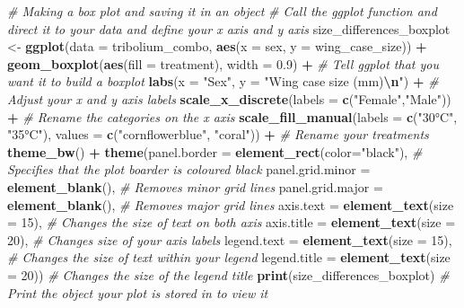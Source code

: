 \documentclass[
]{book}
\newenvironment{Shaded}{\begin{snugshade}}{\end{snugshade}}
\newcommand{\AttributeTok}[1]{\textcolor[rgb]{0.13,0.29,0.53}{#1}}
\newcommand{\CommentTok}[1]{\textcolor[rgb]{0.56,0.35,0.01}{\textit{#1}}}
\newcommand{\DecValTok}[1]{\textcolor[rgb]{0.00,0.00,0.81}{#1}}
\newcommand{\FloatTok}[1]{\textcolor[rgb]{0.00,0.00,0.81}{#1}}
\newcommand{\FunctionTok}[1]{\textcolor[rgb]{0.13,0.29,0.53}{\textbf{#1}}}
\newcommand{\NormalTok}[1]{#1}
\newcommand{\OtherTok}[1]{\textcolor[rgb]{0.56,0.35,0.01}{#1}}
\newcommand{\SpecialCharTok}[1]{\textcolor[rgb]{0.81,0.36,0.00}{\textbf{#1}}}
\newcommand{\StringTok}[1]{\textcolor[rgb]{0.31,0.60,0.02}{#1}}
\begin{document}
\begin{Shaded}
\begin{Highlighting}[]
\CommentTok{\# Making a box plot and saving it in an object}
\CommentTok{\# Call the ggplot function and direct it to your data and define your x axis and y axis}
\NormalTok{size\_differences\_boxplot }\OtherTok{\textless{}{-}} \FunctionTok{ggplot}\NormalTok{(}\AttributeTok{data =}\NormalTok{ tribolium\_combo, }\FunctionTok{aes}\NormalTok{(}\AttributeTok{x =}\NormalTok{ sex, }\AttributeTok{y =}\NormalTok{ wing\_case\_size)) }\SpecialCharTok{+} 
  \FunctionTok{geom\_boxplot}\NormalTok{(}\FunctionTok{aes}\NormalTok{(}\AttributeTok{fill =}\NormalTok{ treatment), }\AttributeTok{width =} \FloatTok{0.9}\NormalTok{) }\SpecialCharTok{+} \CommentTok{\# Tell ggplot that you want it to build a boxplot}
  \FunctionTok{labs}\NormalTok{(}\AttributeTok{x =} \StringTok{"Sex"}\NormalTok{, }\AttributeTok{y =} \StringTok{"Wing case size (mm)}\SpecialCharTok{\textbackslash{}n}\StringTok{"}\NormalTok{) }\SpecialCharTok{+} \CommentTok{\# Adjust your x and y axis labels }
  \FunctionTok{scale\_x\_discrete}\NormalTok{(}\AttributeTok{labels =} \FunctionTok{c}\NormalTok{(}\StringTok{"Female"}\NormalTok{,}\StringTok{"Male"}\NormalTok{)) }\SpecialCharTok{+} \CommentTok{\# Rename the categories on the x axis }
  \FunctionTok{scale\_fill\_manual}\NormalTok{(}\AttributeTok{labels =} \FunctionTok{c}\NormalTok{(}\StringTok{"30°C"}\NormalTok{, }\StringTok{"35°C"}\NormalTok{), }\AttributeTok{values =} \FunctionTok{c}\NormalTok{(}\StringTok{"cornflowerblue"}\NormalTok{, }\StringTok{"coral"}\NormalTok{)) }\SpecialCharTok{+} \CommentTok{\# Rename your treatments}
  \FunctionTok{theme\_bw}\NormalTok{() }\SpecialCharTok{+}
  \FunctionTok{theme}\NormalTok{(}\AttributeTok{panel.border =} \FunctionTok{element\_rect}\NormalTok{(}\AttributeTok{color=}\StringTok{"black"}\NormalTok{), }\CommentTok{\# Specifies that the plot boarder is coloured black}
        \AttributeTok{panel.grid.minor =} \FunctionTok{element\_blank}\NormalTok{(), }\CommentTok{\# Removes minor grid lines }
        \AttributeTok{panel.grid.major =} \FunctionTok{element\_blank}\NormalTok{(), }\CommentTok{\# Removes major grid lines }
        \AttributeTok{axis.text =} \FunctionTok{element\_text}\NormalTok{(}\AttributeTok{size =} \DecValTok{15}\NormalTok{), }\CommentTok{\# Changes the size of text on both axis }
        \AttributeTok{axis.title =} \FunctionTok{element\_text}\NormalTok{(}\AttributeTok{size =} \DecValTok{20}\NormalTok{), }\CommentTok{\# Changes size of your axis labels }
        \AttributeTok{legend.text =} \FunctionTok{element\_text}\NormalTok{(}\AttributeTok{size =} \DecValTok{15}\NormalTok{), }\CommentTok{\# Changes the size of text within your legend}
        \AttributeTok{legend.title =} \FunctionTok{element\_text}\NormalTok{(}\AttributeTok{size =} \DecValTok{20}\NormalTok{)) }\CommentTok{\# Changes the size of the legend title  }
\FunctionTok{print}\NormalTok{(size\_differences\_boxplot) }\CommentTok{\# Print the object your plot is stored in to view it}
\end{Highlighting}
\end{Shaded}
\end{document}
